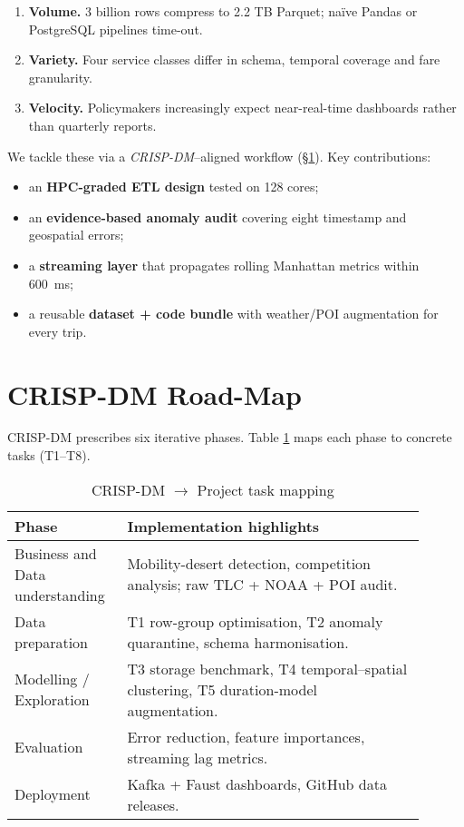 \documentclass[conference]{IEEEtran}
\begin{document}
\begin{enumerate}
  \item \textbf{Volume.} 3 billion rows compress to 2.2 TB Parquet; naïve
    Pandas or PostgreSQL pipelines time-out.
  \item \textbf{Variety.} Four service classes differ in schema,
    temporal coverage and fare granularity.
  \item \textbf{Velocity.} Policymakers increasingly expect
    near-real-time dashboards rather than quarterly reports.
\end{enumerate}

We tackle these via a \emph{CRISP-DM}–aligned workflow
(§\ref{sec:crisp}).
Key contributions:

\begin{itemize}
  \item an \textbf{HPC-graded ETL design} tested on 128 cores;
  \item an \textbf{evidence-based anomaly audit}
    covering eight timestamp and geospatial errors;
  \item a \textbf{streaming layer} that propagates rolling Manhattan
    metrics within \SI{600}{\milli\second};
  \item a reusable \textbf{dataset + code bundle} with weather/POI
    augmentation for every trip.
\end{itemize}

\section{CRISP-DM Road-Map}\label{sec:crisp}
CRISP-DM prescribes six iterative phases.
Table \ref{tab:crisp} maps each phase to concrete tasks (T1–T8).

\begin{table}[htbp]
  \caption{CRISP-DM \(\to\) Project task mapping}
  \label{tab:crisp}
  \centering
  \begin{tabular}{p{0.23\linewidth}p{0.67\linewidth}}
    \toprule
    \textbf{Phase} & \textbf{Implementation highlights} \\ \midrule
    Business and Data understanding &
    Mobility-desert detection, competition analysis; raw TLC + NOAA + POI audit.\\
    Data preparation &
    T1 row-group optimisation, T2 anomaly quarantine, schema harmonisation.\\
    Modelling / Exploration &
    T3 storage benchmark, T4 temporal–spatial clustering,
    T5 duration-model augmentation.\\
    Evaluation &
    Error reduction, feature importances,
    streaming lag metrics.\\
    Deployment &
    Kafka + Faust dashboards, GitHub data releases.\\
    \bottomrule
  \end{tabular}
\end{table}
\end{document}
